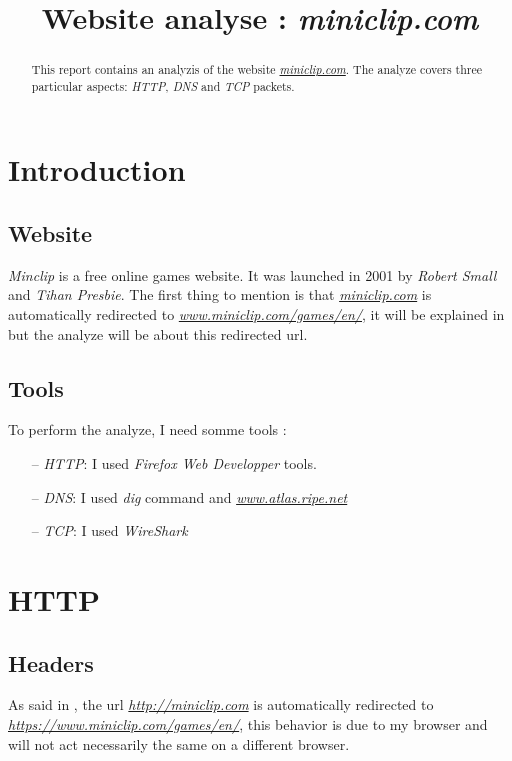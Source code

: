 \documentclass{article}
\title{Website analyse : \textit{miniclip.com}}
\newcommand{\link}[1]{\href{#1}{\textit{#1}}}
\begin{document}
%
\maketitle
%
\begin{abstract}
This report contains an analyzis of the website \link{miniclip.com}. The analyze covers three particular aspects: \textit{HTTP}, \textit{DNS} and \textit{TCP} packets.
\end{abstract}
%
%
\section{Introduction}
\label{sec:intro}
\subsection{Website}
\label{sub:web}
\textit{Minclip} is a free online games website. It was launched in 2001 by \textit{Robert Small} and \textit{Tihan Presbie}. The first thing to mention is that \link{miniclip.com} is automatically redirected to \link{www.miniclip.com/games/en/}, it will be explained in \textbf{} but the analyze will be about this redirected url.
\subsection{Tools}
\label{sub:tools}
To perform the analyze, I need somme tools :
\begin{itemize}
    \item[--] \textit{HTTP}: I used \textit{Firefox Web Developper} tools.
    \item[--] \textit{DNS}: I used \textit{dig} command and \link{www.atlas.ripe.net}
    \item[--] \textit{TCP}: I used \textit{WireShark}
\end{itemize}

\section{HTTP}
\label{sec:HTTP}

\subsection{Headers}
\label{sub:headers}

As said in , the url \link{http://miniclip.com} is automatically redirected to \link{https://www.miniclip.com/games/en/}, this behavior is due to my browser and will not act necessarily the same on a different browser. 
\end{document}

